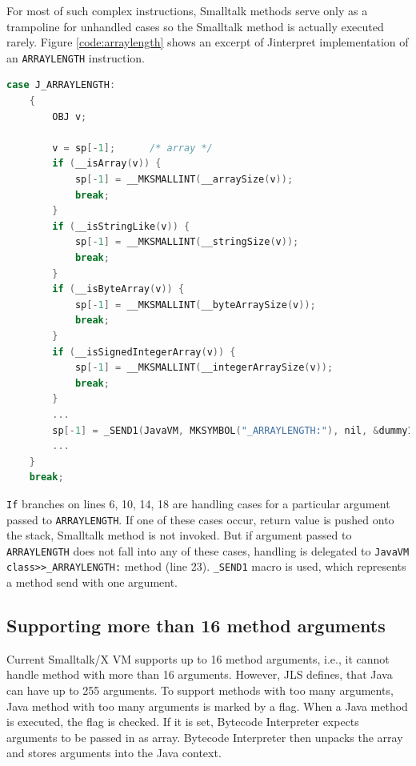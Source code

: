 \documentclass[11pt,twoside,a4paper]{book}
\newcommand{\jinterpret}{Jinterpret}
\begin{document}
For most of such complex instructions, Smalltalk methods serve only as a trampoline for unhandled cases so the Smalltalk method
is actually executed rarely. Figure \ref{code:arraylength} shows an excerpt of \jinterpret{} implementation of an \texttt{ARRAYLENGTH} 
instruction. 

\begin{lstlisting}[language=C, caption=ARRAYLENGTH instruction, label=code:arraylength]
    case J_ARRAYLENGTH:
    {
        OBJ v;

        v = sp[-1];      /* array */
        if (__isArray(v)) {
            sp[-1] = __MKSMALLINT(__arraySize(v));
            break;
        }
        if (__isStringLike(v)) {
            sp[-1] = __MKSMALLINT(__stringSize(v));
            break;
        }
        if (__isByteArray(v)) {
            sp[-1] = __MKSMALLINT(__byteArraySize(v));
            break;
        }
        if (__isSignedIntegerArray(v)) {
            sp[-1] = __MKSMALLINT(__integerArraySize(v));
            break;
        }
        ...
        sp[-1] = _SEND1(JavaVM, MKSYMBOL("_ARRAYLENGTH:"), nil, &dummy1, v);
        ...
    }
    break;
\end{lstlisting}

\texttt{If} branches on lines 6, 10, 14, 18 are handling cases for a particular argument passed to \texttt{ARRAYLENGTH}.
If one of these cases occur, return value is pushed onto the stack, Smalltalk method is not invoked.
But if argument passed to \texttt{ARRAYLENGTH} does not fall into any of these cases, handling is delegated to \texttt{JavaVM class>>\_ARRAYLENGTH:} method (line 23).
\texttt{\_SEND1} macro is used, which represents a method send with one argument.

\subsection{Supporting more than 16 method arguments}
\label{sec:many-arguments}

Current Smalltalk/X VM supports up to 16 method arguments, i.e., it cannot handle method with more than 16 arguments. However, JLS defines, that Java can have up to 255 arguments.\cite[section~4.3.3]{jls}
To support methods with too many arguments, Java method with too many arguments is marked by a flag.
When a Java method is executed, the flag is checked.
If it is set, Bytecode Interpreter expects arguments to be passed in as array.
Bytecode Interpreter then unpacks the array and stores arguments into the Java context.
\end{document}
